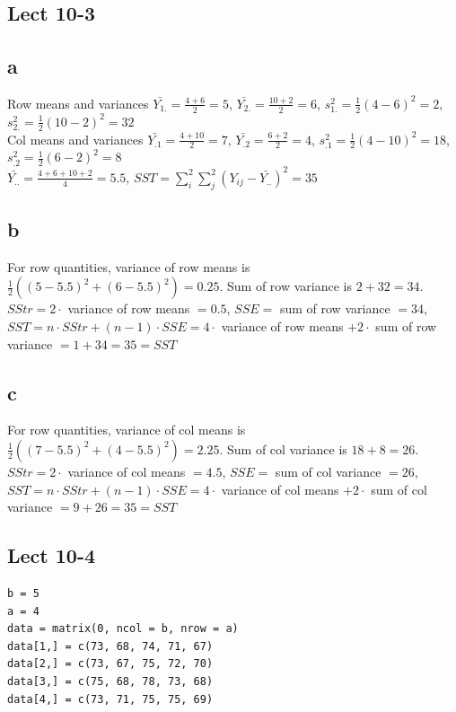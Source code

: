\documentclass[11pt,letterpaper]{article}
\begin{document}
\subsection*{Lect 10-3}
\subsection*{a}
\noindent Row means and variances $\bar{Y_{1.}} = \frac{4 + 6}{2} = 5$, $\bar{Y_{2.}} = \frac{10 + 2}{2} = 6$, $s_{1.}^2 = \frac{1}{2}(4-6)^2 = 2$, $s_{2.}^2 = \frac{1}{2} (10 - 2)^2 = 32$ \\

\noindent Col means and variances $\bar{Y_{.1}} = \frac{4 + 10}{2} = 7$, $\bar{Y_{.2}} = \frac{6 + 2}{2} = 4$, $s_{.1}^2 = \frac{1}{2}(4-10)^2 = 18$, $s_{.2}^2 = \frac{1}{2} (6 - 2)^2 = 8$ \\

\noindent $\bar{Y_{..}} = \frac{4 + 6 + 10 + 2}{4} = 5.5$, $SST = \sum_i^2 \sum_j^2 (Y_{ij} - \bar{Y_{..}})^2 = 35$

\subsection*{b}
\noindent For row quantities, variance of row means is $\frac{1}{2} ((5 - 5.5)^2 + (6 - 5.5)^2) = 0.25$. Sum of row variance is $2 + 32 = 34$. \\

\noindent $SStr = 2 \cdot $ variance of row means $= 0.5$, $SSE = $ sum of row variance $= 34$, $SST = n \cdot SStr + (n-1) \cdot SSE = 4 \cdot $ variance of row means $+ 2 \cdot $ sum of row variance $= 1 + 34 = 35 = SST$ 

\subsection*{c}
\noindent For row quantities, variance of col means is $\frac{1}{2} ((7 - 5.5)^2 + (4 - 5.5)^2) = 2.25$. Sum of col variance is $18 + 8 = 26$. \\

\noindent $SStr = 2 \cdot $ variance of col means $= 4.5$, $SSE = $ sum of col variance $= 26$, $SST = n \cdot SStr + (n-1) \cdot SSE = 4 \cdot $ variance of col means $+ 2 \cdot $ sum of col variance $= 9 + 26 = 35 = SST$ 

\subsection*{Lect 10-4}
\begin{verbatim}
b = 5
a = 4
data = matrix(0, ncol = b, nrow = a)
data[1,] = c(73, 68, 74, 71, 67)
data[2,] = c(73, 67, 75, 72, 70)
data[3,] = c(75, 68, 78, 73, 68)
data[4,] = c(73, 71, 75, 75, 69)
\end{verbatim}
\end{document}
